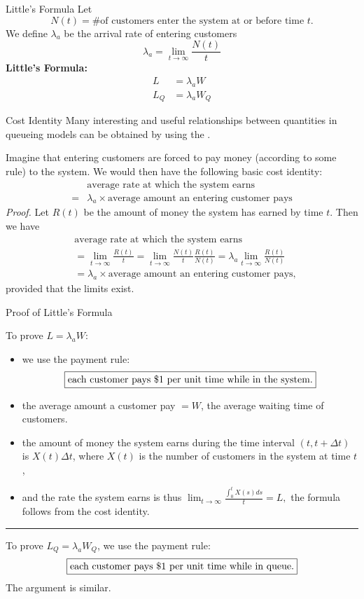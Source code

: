 \documentclass[letterpaper,handout]{beamer}
\def\dt{\Delta}
\begin{document}
\begin{frame}{Little's Formula}
Let
$$N(t) = \text{\# of customers enter the system at or before time }t.$$
We define $\lambda_a$ be the arrival rate of entering customers
$$
\lambda_a=\lim_{t\to\infty}\frac{N(t)}{t}
$$
\textbf{Little's Formula:}
\begin{align*}
L &=\lambda_a W\\
L_Q &=\lambda_a W_Q
\end{align*}
\end{frame}
\begin{frame}{Cost Identity}
Many interesting and useful relationships between quantities in queueing models can be obtained by using the .\smallskip

Imagine that entering customers are forced to pay money (according to some
rule) to the system. We would then have the following basic cost identity:
\begin{align*}
&\text{average rate at which the system earns}\\
={}&\lambda_a\times \text{average amount an entering customer pays}
\end{align*}
{\em Proof.} Let $R(t)$ be the amount of money the system has earned by time $t$. Then we have
\begin{align*}
&\text{average rate at which the system earns}\\
&=\lim_{t\to\infty}\frac{R(t)}{t}=\lim_{t\to\infty}\frac{N(t)}{t}\frac{R(t)}{N(t)}
=\lambda_a\lim_{t\to\infty}\frac{R(t)}{N(t)}\\
&=\lambda_a\times \text{average amount an entering customer pays},
\end{align*}
provided that the limits exist.
\end{frame}
\begin{frame}{Proof of Little's Formula}

To prove $L=\lambda_a W$:
\begin{itemize}
\item we use the payment rule:
$$\text{\fbox{each customer pays \$1 per unit time while in the system.}}$$
\item the average amount a customer pay $= W$, the average waiting time of customers.
\item the amount of money the system earns during the time interval $(t,t+\dt t)$ is $X(t)\dt t$, where $X(t)$ is the number of customers in the system at time $t$ ,
\item and the rate the system earns is thus $\displaystyle\lim_{t\to\infty}\frac{\int_0^{t}X(s)ds}{t}=L,$
the formula follows from the cost identity.
\end{itemize}
\medskip\hrule\medskip
To prove $L_Q=\lambda_a W_Q$, we use the payment rule:
$$\text{\fbox{each customer pays \$1 per unit time while in queue.}}$$
The argument is similar.
\end{frame}
\end{document}
